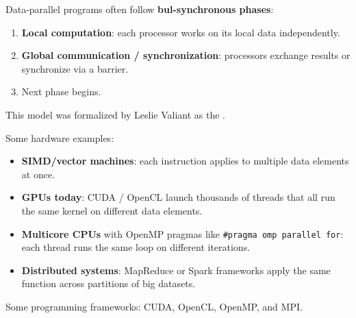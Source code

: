 \highspace
Data-parallel programs often follow \textbf{bul-synchronous phases}:
\begin{enumerate}
    \item \textbf{Local computation}: each processor works on its local data independently.
    \item \textbf{Global communication / synchronization}: processors exchange results or synchronize via a barrier.
    \item Next phase begins.
\end{enumerate}
This model was formalized by Leslie Valiant as the .

\highspace
\begin{examplebox}
    Some hardware examples:
    \begin{itemize}
        \item \textbf{SIMD/vector machines}: each instruction applies to multiple data elements at once.
        \item \textbf{GPUs today}: CUDA / OpenCL launch thousands of threads that all run the same kernel on different data elements.
        \item \textbf{Multicore CPUs} with OpenMP pragmas like \texttt{\#pragma omp parallel for}: each thread runs the same loop on different iterations.
        \item \textbf{Distributed systems}: MapReduce or Spark frameworks apply the same function across partitions of big datasets.
    \end{itemize}
    Some programming frameworks: CUDA, OpenCL, OpenMP, and MPI.
\end{examplebox}

